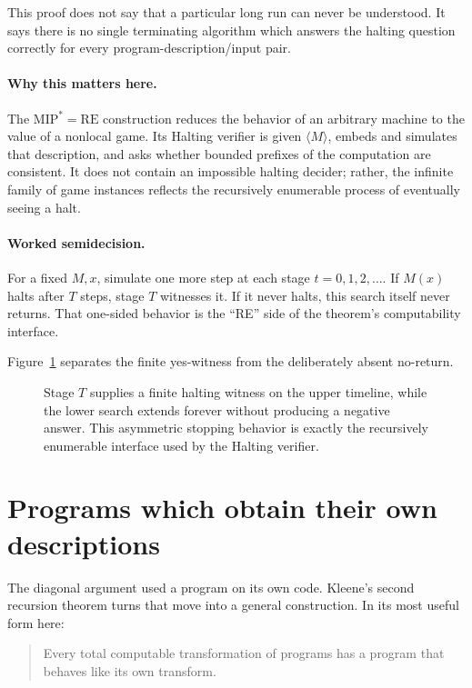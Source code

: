 This proof does not say that a particular long run can never be understood.
It says there is no single terminating algorithm which answers the halting
question correctly for every program-description/input pair.

\paragraph{Why this matters here.}
The \(\mathrm{MIP}^*=\mathrm{RE}\) construction reduces the behavior of an
arbitrary machine to the value of a nonlocal game.  Its Halting verifier is
given \(\langle M\rangle\), embeds and simulates that description, and asks
whether bounded prefixes of the computation are consistent.  It does not
contain an impossible halting decider; rather, the infinite family of game
instances reflects the recursively enumerable process of eventually seeing a
halt.

\paragraph{Worked semidecision.}
For a fixed \(M,x\), simulate one more step at each stage \(t=0,1,2,\ldots\).
If \(M(x)\) halts after \(T\) steps, stage \(T\) witnesses it.  If it never
halts, this search itself never returns.  That one-sided behavior is the
``RE'' side of the theorem's computability interface.

Figure~\ref{fig:semidecision} separates the finite yes-witness from the
deliberately absent no-return.

\begin{figure}[t]
\centering

\caption{Stage \(T\) supplies a finite halting witness on the upper timeline, while the lower search extends forever without producing a negative answer.  This asymmetric stopping behavior is exactly the recursively enumerable interface used by the Halting verifier.}
\label{fig:semidecision}
\end{figure}

\section{Programs which obtain their own descriptions}
\label{sec:refresher-kleene}

The diagonal argument used a program on its own code.  Kleene's second
recursion theorem turns that move into a general construction.  In its most
useful form here:

\begin{quote}
Every total computable transformation of programs has a program that behaves
like its own transform.
\end{quote}

